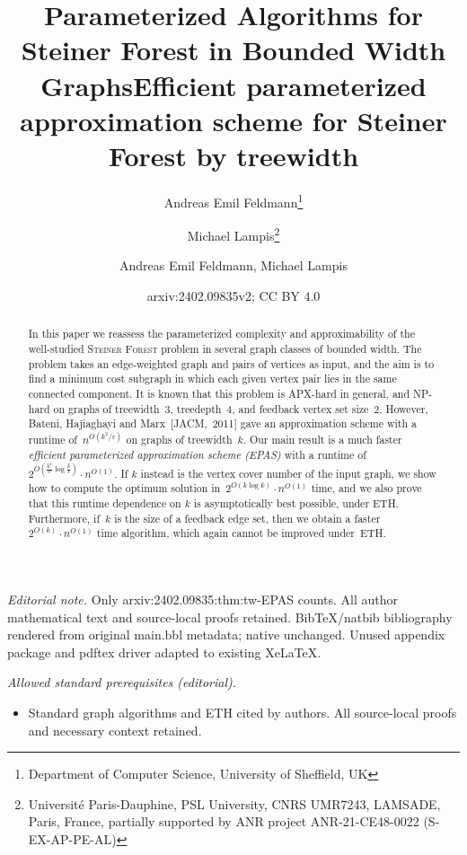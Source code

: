 \documentclass[a4paper]{article}
\title{Parameterized Algorithms for\\
Steiner Forest in Bounded Width Graphs}
\author{Andreas Emil Feldmann\thanks{Department of Computer Science, University 
of Sheffield, UK}
\and
Michael Lampis\thanks{Universit\'{e} Paris-Dauphine, PSL University, CNRS 
UMR7243, LAMSADE, Paris, France, partially supported by ANR project 
ANR-21-CE48-0022 (S-EX-AP-PE-AL)}
}
\date{}
\title{Efficient parameterized approximation scheme for Steiner Forest by treewidth}
\author{Andreas Emil Feldmann, Michael Lampis}
\date{arxiv:2402.09835v2; CC BY 4.0}
\theoremstyle{plain}
\newcommand{\eps}{{\varepsilon}}
\newcommand{\pname}[1]{\textsc{#1}}
\newcommand{\SF}{\pname{Steiner Forest}\xspace}
\begin{document}
\maketitle
\noindent\textit{Editorial note.} Only arxiv:2402.09835:thm:tw-EPAS counts. All author mathematical text and source-local proofs retained. BibTeX/natbib bibliography rendered from original main.bbl metadata; native unchanged. Unused appendix package and pdftex driver adapted to existing XeLaTeX.\par\medskip
\noindent\textit{Allowed standard prerequisites (editorial).}\begin{itemize}
\item Standard graph algorithms and ETH cited by authors. All source-local proofs and necessary context retained.
\end{itemize}\medskip

\maketitle
%

\begin{abstract}

In this paper we reassess the parameterized complexity and approximability of
the well-studied \SF problem in several graph classes of bounded width. The
problem takes an edge-weighted graph and pairs of vertices as input, and the
aim is to find a minimum cost subgraph in which each given vertex pair lies in
the same connected component.  It is known that this problem is APX-hard in
general, and NP-hard on graphs of treewidth~3, treedepth~4, and feedback vertex
set size~2. However, Bateni, Hajiaghayi and Marx~[JACM,~2011] gave an approximation scheme
with a runtime of~$n^{O(k^2/\eps)}$ on graphs of treewidth~$k$. Our main result
is a much faster \emph{efficient parameterized approximation scheme (EPAS)}
with a runtime of~$2^{O(\frac{k^2}{\eps}\log\frac{k}{\eps})}\cdot n^{O(1)}$. If
$k$ instead is the vertex cover number of the input graph, we show how to
compute the optimum solution in~$2^{O(k\log k)}\cdot n^{O(1)}$ time, and we
also prove that this runtime dependence on $k$ is asymptotically best possible,
under ETH.  Furthermore, if~$k$ is the size of a feedback edge set, then we
obtain a faster~$2^{O(k)}\cdot n^{O(1)}$ time algorithm, which again cannot be
improved under~ETH.

\end{abstract}

%
%
%
%
%
%
%
%
%
%
%
%
%
%
%
%
%
\end{document}
